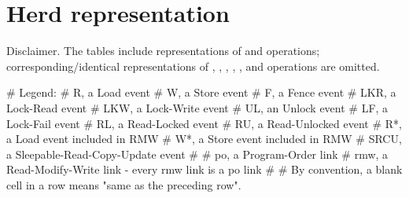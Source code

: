 \section{Herd representation}
\label{sec:lkmm:Herd representation}

\begin{Note}
  Disclaimer.
  The tables include representations of  and  operations;
  corresponding/identical representations of , , ,
  , , and  operations are omitted.
\end{Note}

\begin{VerbatimU}[tabsize=8]
# Legend:
#	R,	a Load event
#	W,	a Store event
#	F,	a Fence event
#	LKR,	a Lock-Read event
#	LKW,	a Lock-Write event
#	UL,	an Unlock event
#	LF,	a Lock-Fail event
#	RL,	a Read-Locked event
#	RU,	a Read-Unlocked event
#	R*,	a Load event included in RMW
#	W*,	a Store event included in RMW
#	SRCU,	a Sleepable-Read-Copy-Update event
#
#	po,	a Program-Order link
#	rmw,	a Read-Modify-Write link - every rmw link is a po link
#
# By convention, a blank cell in a row means "same as the preceding row".
\end{VerbatimU}

\newcommand{\Dark}{\rowcolor{lightgray}}
\newcommand{\Extraspace}{\addlinespace[2pt]}

